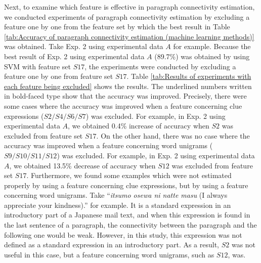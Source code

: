 \documentclass[english]{jnlp_1.4}
\begin{document}
\begin{table}[b]
 \label{tab:Results of experiments with each feature being excluded}

\end{table}


Next, 
to examine which feature is effective in paragraph connectivity estimation, 
we conducted experiments of paragraph connectivity estimation
by excluding a feature one by one from the feature set 
by which the best result in 
Table \ref{tab:Accuracy of paragraph connectivity estimation (machine learning methods)} was 
obtained.
Take Exp. 2 using experimental data $A$ 
for example. 
Because the best result of Exp. 2 using experimental data $A$ (89.7\%) 
was obtained by using SVM with feature set $S17$, 
the experiments were conducted 
by excluding a feature one by one from feature set $S17$.  
Table \ref{tab:Results of experiments with each feature being excluded} shows the results. 
The underlined numbers written in bold-faced type show that 
the accuracy was improved.
Precisely, 
there were some cases where the accuracy was improved 
when a feature concerning clue expressions ($S2/S4/S6/S7$) was excluded.
For example, in Exp. 2 using experimental data $A$, 
we obtained 0.4\% increase of accuracy 
when $S2$ was excluded from feature set $S17$.
On the other hand, 
there was no case where the accuracy was improved 
when a feature concerning word unigrams ($S9/S10/S11/S12$) was excluded.
For example, in Exp. 2 using experimental data $A$, 
we obtained 13.5\% decrease of accuracy 
when $S12$ was excluded from feature set $S17$.
Furthermore, 
we found some examples 
which were not estimated properly by using a feature 
concerning clue expressions, 
but by using a feature concerning word unigrams.
Take 
``\textit{itsumo osewa ni natte masu} (I always appreciate your kindness).'' 
for example.
It is a standard expression in an introductory part of a Japanese mail text, 
and when this expression is found in the last sentence of a paragraph, 
the connectivity between the paragraph and the following one would be weak. 
However, in this study, 
this expression was not defined as a standard expression in an introductory part.
As a result, 
$S2$ was not useful in this case, 
but a feature concerning word unigrams, such as $S12$, was.
\end{document}
